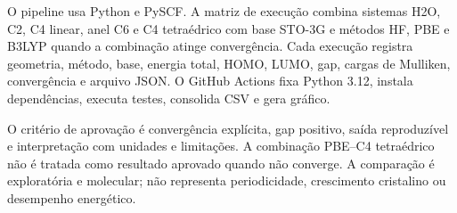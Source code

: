 O pipeline usa Python e PySCF. A matriz de execução combina sistemas H2O, C2, C4 linear, anel C6 e C4 tetraédrico com base STO-3G e métodos HF, PBE e B3LYP quando a combinação atinge convergência. Cada execução registra geometria, método, base, energia total, HOMO, LUMO, gap, cargas de Mulliken, convergência e arquivo JSON. O GitHub Actions fixa Python 3.12, instala dependências, executa testes, consolida CSV e gera gráfico.

O critério de aprovação é convergência explícita, gap positivo, saída reproduzível e interpretação com unidades e limitações. A combinação PBE--C4 tetraédrico não é tratada como resultado aprovado quando não converge. A comparação é exploratória e molecular; não representa periodicidade, crescimento cristalino ou desempenho energético.
